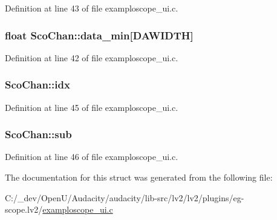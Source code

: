 Definition at line 43 of file examploscope\+\_\+ui.\+c.

\subsubsection[{\texorpdfstring{data\+\_\+min}{data_min}}]{\setlength{\rightskip}{0pt plus 5cm}float Sco\+Chan\+::data\+\_\+min\mbox{[}{\bf D\+A\+W\+I\+D\+TH}\mbox{]}}\hypertarget{struct_sco_chan_a916621c0a1f7073e84959158c96339bf}{}\label{struct_sco_chan_a916621c0a1f7073e84959158c96339bf}


Definition at line 42 of file examploscope\+\_\+ui.\+c.

\subsubsection[{\texorpdfstring{idx}{idx}}]{ Sco\+Chan\+::idx}\hypertarget{struct_sco_chan_a93db1295c8c6cb7def762e4a7e361e39}{}\label{struct_sco_chan_a93db1295c8c6cb7def762e4a7e361e39}


Definition at line 45 of file examploscope\+\_\+ui.\+c.

\subsubsection[{\texorpdfstring{sub}{sub}}]{ Sco\+Chan\+::sub}\hypertarget{struct_sco_chan_ae510fb6c258e925534c53adedc5f7a9f}{}\label{struct_sco_chan_ae510fb6c258e925534c53adedc5f7a9f}


Definition at line 46 of file examploscope\+\_\+ui.\+c.



The documentation for this struct was generated from the following file\+:\begin{DoxyCompactItemize}
\item 
C\+:/\+\_\+dev/\+Open\+U/\+Audacity/audacity/lib-\/src/lv2/lv2/plugins/eg-\/scope.\+lv2/\hyperlink{examploscope__ui_8c}{examploscope\+\_\+ui.\+c}\end{DoxyCompactItemize}
